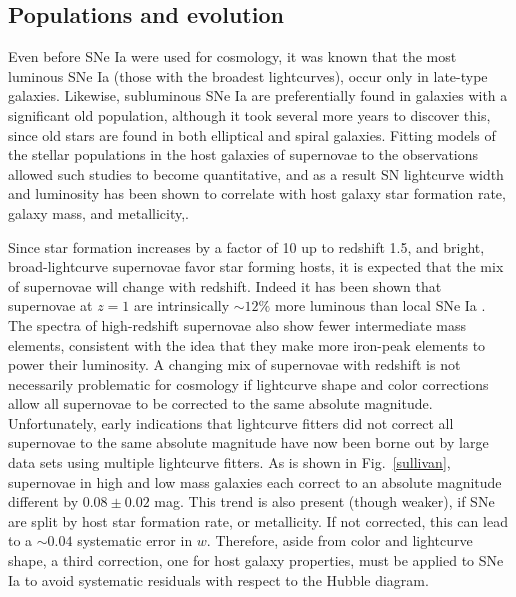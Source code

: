 \documentclass{nature1}
\begin{document}
\subsection{Populations and evolution}
Even before SNe Ia were used for cosmology, it was known that the most
luminous SNe Ia (those with the broadest lightcurves), occur only in
late-type galaxies\citep{1996AJ....112.2391H}.  Likewise, subluminous
SNe Ia are preferentially found in galaxies with a significant old
population, although it took several more years to discover this,
since old stars are found in both elliptical and spiral
galaxies\citep{2001ApJ...554L.193H}.  Fitting models of the stellar
populations in the host galaxies of supernovae to the observations
allowed such studies to become
quantitative\citep{2006ApJ...648..868S}, and as a result SN lightcurve
width and luminosity has been shown to correlate with host galaxy star
formation rate, galaxy mass, and
metallicity,\citep{2006ApJ...648..868S,2008ApJ...685..752G,
  2009ApJ...691..661H,2009ApJ...707.1449N,2010MNRAS.406..782S}.

Since star formation increases by a factor of 10 up to redshift 1.5,
and bright, broad-lightcurve supernovae favor star forming hosts, it
is expected that the mix of supernovae will change with redshift.
Indeed it has been shown that supernovae at $z=1$ are intrinsically
$\sim 12\%$ more luminous than local SNe Ia
\citep{2007ApJ...667L..37H}.  The spectra of high-redshift supernovae
also show fewer intermediate mass elements, consistent with the idea
that they make more iron-peak elements to power their
luminosity\citep{2009ApJ...693L..76S}.  A changing mix of supernovae
with redshift is not necessarily problematic for cosmology if
lightcurve shape and color corrections allow all supernovae to be
corrected to the same absolute magnitude.  Unfortunately, early
indications that lightcurve fitters did not correct all supernovae to
the same absolute
magnitude\citep{2008ApJ...685..752G,2009ApJ...700.1097H,2010ApJ...715..743K}
have now been borne out by large data sets using multiple lightcurve
fitters\citep{2010MNRAS.406..782S,2010ApJ...722..566L}.  As is shown in
Fig.~\ref{sullivan}, supernovae in high and low mass galaxies each
correct to an absolute magnitude different by $0.08\pm0.02$ mag.  This
trend is also present (though weaker), if SNe are split by host star
formation rate, or metallicity.  If not corrected, this can lead to a
$\sim 0.04$ systematic error in $w$\citep{2010MNRAS.406..782S}.
Therefore, aside from color and lightcurve shape, a third correction,
one for host galaxy properties, must be applied to SNe Ia to avoid
systematic residuals with respect to the Hubble diagram.
\end{document}
